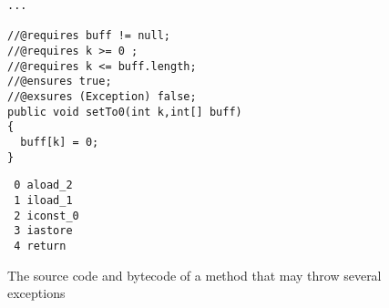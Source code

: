 \begin{figure}
\begin{minipage}[b]{0.5\linewidth}
\begin{verbatim}
...

//@requires buff != null;
//@requires k >= 0 ;
//@requires k <= buff.length;
//@ensures true;
//@exsures (Exception) false;
public void setTo0(int k,int[] buff)
{
  buff[k] = 0;
}
\end{verbatim}
\end{minipage}
\hspace{.5cm}
\begin{minipage}[b]{0.4\linewidth}
 \begin{verbatim}
 0 aload_2
 1 iload_1
 2 iconst_0
 3 iastore
 4 return
\end{verbatim}
\end{minipage}
\caption{\sc The source code and bytecode of a method that may throw several exceptions}
\label{fig:jmlpreciseex}
\end{figure}





